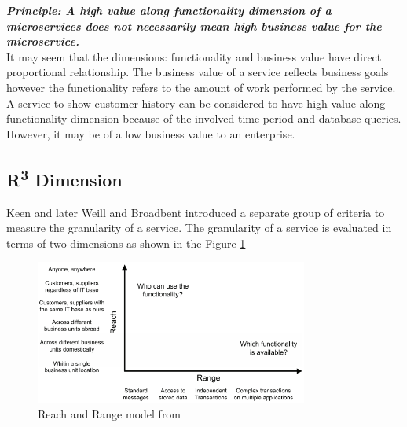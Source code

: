 \begin{framed}
\textbf{\textit{Principle: A high value along functionality dimension of a microservices does not necessarily mean high business value for the microservice.}}
\\
It may seem that the dimensions: functionality and business value have direct proportional relationship. The business value of a service reflects business goals however the functionality refers to the amount of work performed by the service. A service to show customer history can be considered to have high value along functionality dimension because of the involved time period and database queries. However, it may be of a low business value to an enterprise. \cite{Raf-Haesen:2015aa}
\end{framed}


\subsection{R\textsuperscript{3} Dimension}\label{subsection:granularity/dimensions/r3}
Keen \cite{Keen:2015aa} and later  Weill and Broadbent \cite{Weill:1998aa} introduced a separate group of criteria to measure the granularity of a service. The granularity of a service is evaluated in terms of two dimensions as shown in the Figure \ref{fig:Reach-Range Model}

\begin{figure}[H]
\begin{center}
\includegraphics[width=0.8\textwidth]{figures/Granularity-R3-one}
\caption{Reach and Range model from \cite{Keen:2015aa, Weill:1998aa}}
\label{fig:Reach-Range Model}
\end{center}
\end{figure}

